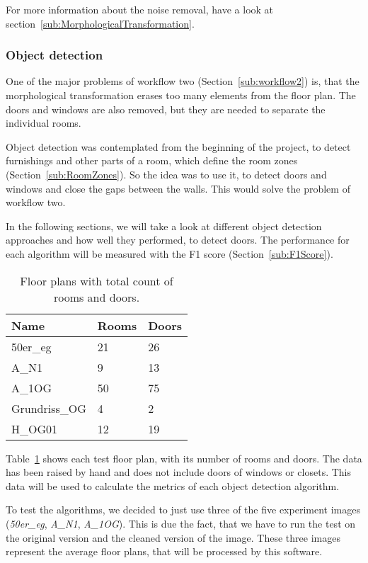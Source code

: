 For more information about the noise removal, have a look at section~\ref{sub:MorphologicalTransformation}.

\subsubsection{Object detection}
One of the major problems of workflow two (Section~\ref{sub:workflow2}) is, that the morphological transformation erases too many elements from the floor plan. The doors and windows are also removed, but they are needed to separate the individual rooms.

Object detection was contemplated from the beginning of the project, to detect furnishings and other parts of a room, which define the room zones (Section~\ref{sub:RoomZones}). So the idea was to use it, to detect doors and windows and close the gaps between the walls. This would solve the problem of workflow two.

In the following sections, we will take a look at different object detection approaches and how well they performed, to detect doors. The performance for each algorithm will be measured with the F1 score (Section~\ref{sub:F1Score}).

\begin{table}[H]
\centering
\caption{Floor plans with total count of rooms and doors.}
\label{tbl:FloorPlanData}
\begin{tabular}{@{}lll@{}}
\toprule
Name          & Rooms & Doors \\ \midrule
50er\_eg      & 21    & 26    \\
A\_N1         & 9     & 13    \\
A\_1OG        & 50    & 75    \\
Grundriss\_OG & 4     & 2     \\
H\_OG01       & 12    & 19    \\ \bottomrule
\end{tabular}
\end{table}

Table~\ref{tbl:FloorPlanData} shows each test floor plan, with its number of rooms and doors. The data has been raised by hand and does not include doors of windows or closets. This data will be used to calculate the metrics of each object detection algorithm.

To test the algorithms, we decided to just use three of the five experiment images (\textit{50er\_eg}, \textit{A\_N1}, \textit{A\_1OG}). This is due the fact, that we have to run the test on the original version and the cleaned version of the image. These three images represent the average floor plans, that will be processed by this software.


